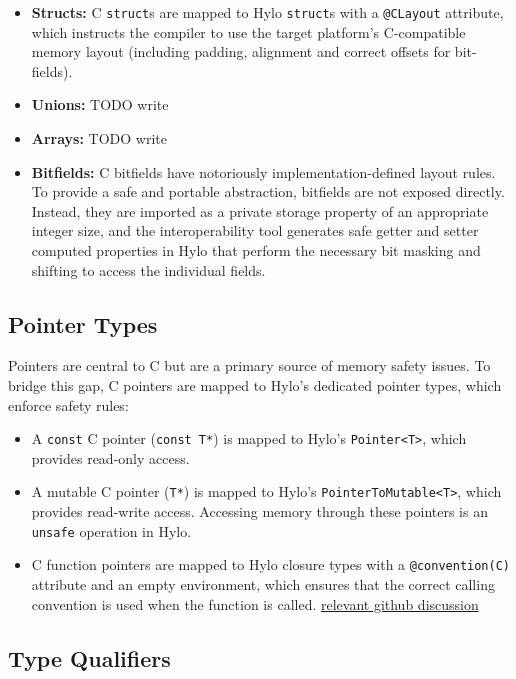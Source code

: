 \begin{itemize}
    \item \textbf{Structs:} C \texttt{struct}s are mapped to Hylo \texttt{struct}s with a \texttt{@CLayout} attribute, which instructs the compiler to use the target platform's C-compatible memory layout (including padding, alignment and correct offsets for bit-fields).
    \item \textbf{Unions:} TODO write
    \item \textbf{Arrays:} TODO write
    \item \textbf{Bitfields:} C bitfields have notoriously implementation-defined layout rules. To provide a safe and portable abstraction, bitfields are not exposed directly. Instead, they are imported as a private storage property of an appropriate integer size, and the interoperability tool generates safe getter and setter computed properties in Hylo that perform the necessary bit masking and shifting to access the individual fields.
\end{itemize}

\subsection{Pointer Types}

Pointers are central to C but are a primary source of memory safety issues. To bridge this gap, C pointers are mapped to Hylo's dedicated pointer types, which enforce safety rules:
\begin{itemize}
    \item A \texttt{const} C pointer (\texttt{const T*}) is mapped to Hylo's \texttt{Pointer<T>}, which provides read-only access.
    \item A mutable C pointer (\texttt{T*}) is mapped to Hylo's \texttt{PointerToMutable<T>}, which provides read-write access. Accessing memory through these pointers is an \texttt{unsafe} operation in Hylo.
    \item C function pointers are mapped to Hylo closure types with a \texttt{@convention(C)} attribute and an empty environment, which ensures that the correct calling convention is used when the function is called. \href{https://github.com/orgs/hylo-lang/discussions/1705}{relevant github discussion}
\end{itemize}

\subsection{Type Qualifiers}

